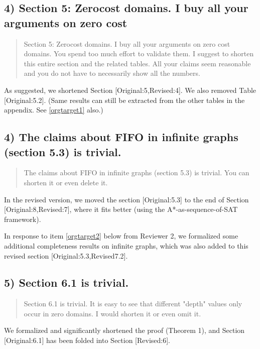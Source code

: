\documentclass{article}
\begin{document}
\subsection{4) Section 5: Zerocost domains. I buy all your arguments on zero cost}
\label{sec:orgheadline4}

\begin{quote}
Section 5: Zerocost domains. I buy all your arguments on zero cost
domains. You spend too much effort to validate them. I suggest to
shorten this entire section and the related tables. All your claims
seem reasonable and you do not have to necessarily show all the
numbers.
\end{quote}

As suggested, we shortened Section [Original:5,Revised:4].
We also removed Table [Original:5.2].
(Same results can still be extracted from the other tables in the appendix. See \ref{orgtarget1} also.)

\subsection{4)  The claims about FIFO in infinite graphs (section 5.3) is trivial.}
\label{sec:orgheadline5}

\begin{quote}
The claims about FIFO in infinite graphs (section 5.3) is trivial. You can shorten it or even delete it.
\end{quote}

In the revised version, we moved the section [Original:5.3] to the end of Section [Original:8,Revised:7],
where it fits better (using the A*-as-sequence-of-SAT framework).

In response to item \ref{orgtarget2} below from Reviewer 2, 
we formalized some additional completeness results on infinite graphs,
which was also added to this revised section [Original:5.3,Revised7.2].

\subsection{5) Section 6.1 is trivial.}
\label{sec:orgheadline6}

\begin{quote}
Section 6.1 is trivial. It is easy to see that different "depth"
values only occur in zero domains. I would shorten it or even omit it.
\end{quote}

We formalized and significantly shortened the proof (Theorem 1),
and Section [Original:6.1] has been folded into Section [Revised:6].
\end{document}
